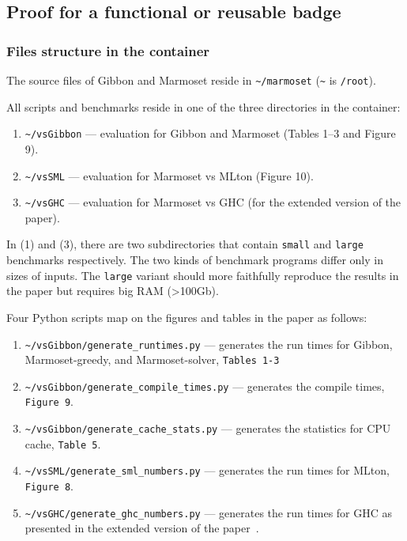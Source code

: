 \hypertarget{for-authors-claiming-a-functional-or-reusable-badge}{%
\subsection{Proof for a functional or reusable
badge}\label{for-authors-claiming-a-functional-or-reusable-badge}}

\hypertarget{files-structure-in-the-container}{%
\subsubsection{Files structure in the
container}\label{files-structure-in-the-container}}

The source files of Gibbon and Marmoset reside in
\texttt{\textasciitilde{}/marmoset} (\texttt{\textasciitilde{}} is
\texttt{/root}).

All scripts and benchmarks reside in one of the three directories in the
container:

\begin{enumerate}
\def\labelenumi{\arabic{enumi}.}
\item
  \texttt{\textasciitilde{}/vsGibbon} --- evaluation for Gibbon and
  Marmoset (Tables 1--3 and Figure 9).
\item
  \texttt{\textasciitilde{}/vsSML} --- evaluation for Marmoset vs MLton
  (Figure 10).
\item
  \texttt{\textasciitilde{}/vsGHC} --- evaluation for Marmoset vs GHC
  (for the extended version of the paper).
\end{enumerate}

In (1) and (3), there are two subdirectories that contain \texttt{small}
and \texttt{large} benchmarks respectively. The two kinds of benchmark
programs differ only in sizes of inputs. The \texttt{large} variant
should more faithfully reproduce the results in the paper but requires
big RAM (\textgreater100Gb).

Four Python scripts map on the figures and tables in the paper as
follows:

\begin{enumerate}
\def\labelenumi{\arabic{enumi}.}
\item
  \texttt{\textasciitilde{}/vsGibbon/generate\_runtimes.py} ---
  generates the run times for Gibbon, Marmoset-greedy, and
  Marmoset-solver, \texttt{Tables\ 1-3}
\item
  \texttt{\textasciitilde{}/vsGibbon/generate\_compile\_times.py} ---
  generates the compile times, \texttt{Figure\ 9}.
\item
  \texttt{\textasciitilde{}/vsGibbon/generate\_cache\_stats.py} ---
  generates the statistics for CPU cache, \texttt{Table\ 5}.
\item
  \texttt{\textasciitilde{}/vsSML/generate\_sml\_numbers.py} ---
  generates the run times for MLton, \texttt{Figure\ 8}.
\item
  \texttt{\textasciitilde{}/vsGHC/generate\_ghc\_numbers.py} ---
  generates the run times for GHC as presented in the extended version
  of the paper~\cite{singhal2024optimizinglayoutrecursivedatatypes}.
\end{enumerate}


